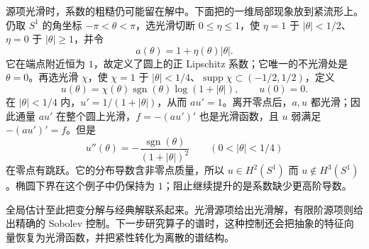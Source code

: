 源项光滑时，系数的粗糙仍可能留在解中。下面把的一维局部现象放到紧流形上。仍取 \(S^1\) 的角坐标 \(-\pi<\theta<\pi\)，选光滑切断 \(0\leq\eta\leq1\)，使 \(\eta=1\) 于 \(|\theta|<1/2\)、\(\eta=0\) 于 \(|\theta|\geq1\)，并令
\[
 a(\theta)=1+\eta(\theta)|\theta|.
\]
它在端点附近恒为 \(1\)，故定义了圆上的正 Lipschitz 系数；它唯一的不光滑处是 \(\theta=0\)。再选光滑 \(\chi\)，使 \(\chi=1\) 于 \(|\theta|<1/4\)、\(\operatorname{supp}\chi\subset(-1/2,1/2)\)，定义
\[
 u(\theta)=\chi(\theta)\operatorname{sgn}(\theta)\log(1+|\theta|),
 \qquad u(0)=0.
\]
在 \(|\theta|<1/4\) 内，\(u'=1/(1+|\theta|)\)，从而 \(au'=1\)。离开零点后，\(a,u\) 都光滑；因此通量 \(au'\) 在整个圆上光滑，\(f=-(au')'\) 也是光滑函数，且 \(u\) 弱满足 \(-(au')'=f\)。但是
\[
 u''(\theta)=-\frac{\operatorname{sgn}(\theta)}{(1+|\theta|)^2}
 \qquad(0<|\theta|<1/4)
\]
在零点有跳跃。它的分布导数含非零点质量，所以 \(u\in H^2(S^1)\) 而 \(u\notin H^3(S^1)\)。椭圆下界在这个例子中仍保持为 \(1\)；阻止继续提升的是系数缺少更高阶导数。

全局估计至此把变分解与经典解联系起来。光滑源项给出光滑解，有限阶源项则给出精确的 Sobolev 控制。下一步研究算子的谱时，这种控制还会把抽象的特征向量恢复为光滑函数，并把紧性转化为离散的谱结构。

